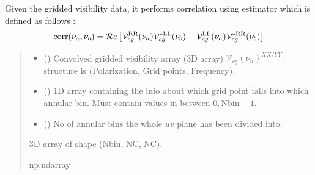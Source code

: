 \documentclass[a4paper,11pt,oneside,english,openany]{sphinxmanual}
\begin{document}

\begin{fulllineitems}
\label{\detokenize{clfuncs:clfuncs.correlate}}
\pysigstartsignatures
{}
\pysigstopsignatures
\sphinxAtStartPar
Given the gridded visibility data, it performs correlation using  estimator which is defined as follows :
\begin{equation*}
\begin{split}\text{corr}(\nu_a,\nu_b) = \mathcal{R}e\left[\mathcal{V}_{cg}^{\rm RR}(\nu_a) \mathcal{V}_{cg}^{*\rm LL}(\nu_b) + \mathcal{V}_{cg}^{\rm LL}(\nu_a) \mathcal{V}_{cg}^{*\rm RR}(\nu_b) \right]\end{split}
\end{equation*}\begin{quote}\begin{description}
\begin{itemize}
\item {} 
\sphinxAtStartPar
{} () \textendash{} Convolved gridded visibility array (3D array) \(\mathcal{V}_{cg}(\nu_n)^{XX/YY}\).  structure is (Polarization, Grid points, Frequency).

\item {} 
\sphinxAtStartPar
{} () \textendash{} 1D array containing the info about which grid point falls into which annular bin. Must contain values in between \(0,\textrm{Nbin}-1\).

\item {} 
\sphinxAtStartPar
{} () \textendash{} No of annular bins the whole \(uv\) plane has been divided into.

\end{itemize}

\sphinxAtStartPar
{} \textendash{} 3D array of shape (Nbin, NC, NC).

\sphinxAtStartPar
np.ndarray


\end{description}
\end{quote}
\end{fulllineitems}
\end{document}
